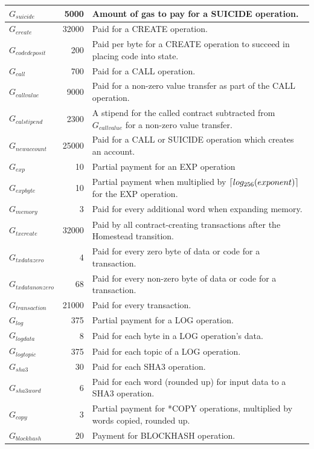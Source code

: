 \documentclass{article}
\DeclarePairedDelimiter{\ceil}{\lceil}{\rceil}
\begin{document}
\begin{table}[!ht]
\begin{tabular}{| l | r | p{8cm} |}
			$G_{suicide}$ 		& 5000 		& Amount of gas to pay for a SUICIDE operation. \\ \hline
			$G_{create}$ 		& 32000		& Paid for a CREATE operation. \\ \hline
			$G_{codedeposit}$ 	& 200 		& Paid per byte for a CREATE operation to succeed in placing code into state. \\ \hline
			$G_{call}$ 			& 700		& Paid for a CALL operation. \\ \hline
			$G_{callvalue}$ 	& 9000		& Paid for a non-zero value transfer as part of the CALL operation. \\ \hline
			$G_{calstipend}$ 	& 2300		& A stipend for the called contract subtracted from $G_{callvalue}$ for a non-zero value transfer. \\ \hline
			$G_{newaccount}$ 	& 25000		& Paid for a CALL or SUICIDE operation which creates an account. \\ \hline
			$G_{exp}$ 			& 10 		& Partial payment for an EXP operation \\ \hline
			$G_{expbyte}$ 		& 10		& Partial payment when multiplied by $\ceil{log_{256}(exponent)}$  for the EXP operation. 	 \\ \hline
			$G_{memory}$ 		& 3			& Paid for every additional word when expanding memory. \\ \hline
			$G_{txcreate}$ 		& 32000		& Paid by all contract-creating transactions after the Homestead transition. \\ \hline
			$G_{txdatazero}$ 	& 4 		& Paid for every zero byte of data or code for a transaction. \\ \hline
			$G_{txdatanonzero}$ & 68		& Paid for every non-zero byte of data or code for a transaction. \\ \hline
			$G_{transaction}$ 	& 21000		& Paid for every transaction. \\ \hline
			$G_{log}$ 			& 375 		& Partial payment for a LOG operation. \\ \hline
			$G_{logdata}$ 		& 8			& Paid for each byte in a LOG operation's data. \\ \hline
			$G_{logtopic}$ 		& 375		& Paid for each topic of a LOG operation. \\ \hline
			$G_{sha3}$ 			& 30		& Paid for each SHA3 operation. \\ \hline
			$G_{sha3word}$ 		& 6			& Paid for each word (rounded up) for input data to a SHA3 operation. \\ \hline
			$G_{copy}$ 			& 3			& Partial payment for *COPY operations, multiplied by words copied, rounded up. \\ \hline
			$G_{blockhash}$ 	& 20		& Payment for BLOCKHASH operation. \\ 
			\hline
		\end{tabular}
		\end{table}
		\FloatBarrier
\end{document}
